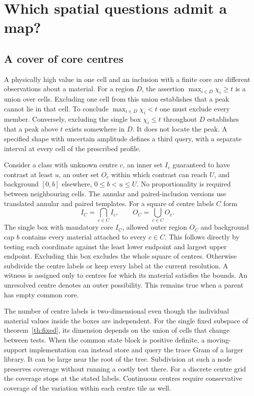 \section{Which spatial questions admit a map?}\label{sec:space}
\subsection{A cover of core centres}
A physically high value in one cell and an inclusion with a finite core are different observations about a material. For a region $D$, the assertion $\max_{i\in D}\chi_i\ge t$ is a union over cells. Excluding one cell from this union establishes that a peak cannot lie in that cell. To conclude $\max_{i\in D}\chi_i<t$ one must exclude every member. Conversely, excluding the single box $\chi_i\le t$ throughout $D$ establishes that a peak above $t$ exists somewhere in $D$. It does not locate the peak. A specified shape with uncertain amplitude defines a third query, with a separate interval at every cell of the prescribed profile.

Consider a class with unknown centre $c$, an inner set $I_c$ guaranteed to have contrast at least $u$, an outer set $O_c$ within which contrast can reach $U$, and background $[0,b]$ elsewhere, $0\le b<u\le U$. No proportionality is required between neighbouring cells. The annular and paired-inclusion versions use translated annular and paired templates. For a square of centre labels $C$ form
\begin{equation}
 I_C=\bigcap_{c\in C} I_c,\qquad O_C=\bigcup_{c\in C} O_c .
 \label{eq:map}
\end{equation}
The single box with mandatory core $I_C$, allowed outer region $O_C$ and background cap $b$ contains every material attached to every $c\in C$. This follows directly by testing each coordinate against the least lower endpoint and largest upper endpoint. Excluding this box excludes the whole square of centres. Otherwise subdivide the centre labels or keep every label at the current resolution. A witness is assigned only to centres for which its material satisfies the bounds. An unresolved centre denotes an outer possibility. This remains true when a parent has empty common core.

The number of centre labels is two-dimensional even though the individual material values inside the boxes are independent. For the single fixed subspace of theorem~\ref{th:fixed}, its dimension depends on the union of cells that change between tests. When the common state block is positive definite, a moving-support implementation can instead store and query the trace Gram of a larger library. It can be large near the root of the tree. Subdivision at such a node preserves coverage without running a costly test there. For a discrete centre grid the coverage stops at the stated labels. Continuous centres require conservative coverage of the variation within each centre tile as well.

